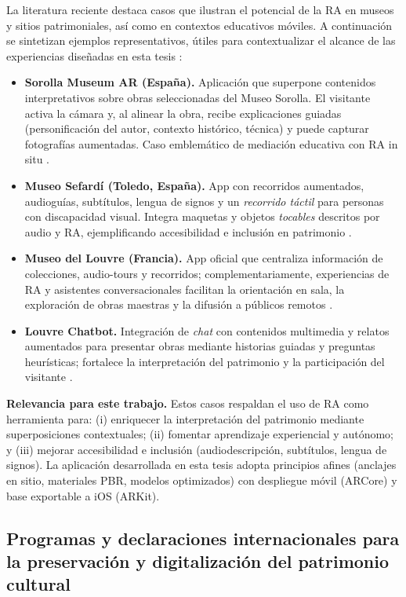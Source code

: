La literatura reciente destaca casos que ilustran el potencial de la RA en museos y sitios patrimoniales, así como en contextos educativos móviles. A continuación se sintetizan ejemplos representativos, útiles para contextualizar el alcance de las experiencias diseñadas en esta tesis \cite{HernandezLopez2021}:

\begin{itemize}
  \item \textbf{Sorolla Museum AR (España).} Aplicación que superpone contenidos interpretativos sobre obras seleccionadas del Museo Sorolla. El visitante activa la cámara y, al alinear la obra, recibe explicaciones guiadas (personificación del autor, contexto histórico, técnica) y puede capturar fotografías aumentadas. Caso emblemático de mediación educativa con RA in situ \cite{HernandezLopez2021}.
  \item \textbf{Museo Sefardí (Toledo, España).} App con recorridos aumentados, audioguías, subtítulos, lengua de signos y un \emph{recorrido táctil} para personas con discapacidad visual. Integra maquetas y objetos \emph{tocables} descritos por audio y RA, ejemplificando accesibilidad e inclusión en patrimonio \cite{HernandezLopez2021}.
  \item \textbf{Museo del Louvre (Francia).} App oficial que centraliza información de colecciones, audio-tours y recorridos; complementariamente, experiencias de RA y asistentes conversacionales facilitan la orientación en sala, la exploración de obras maestras y la difusión a públicos remotos \cite{HernandezLopez2021}.
  \item \textbf{Louvre Chatbot.} Integración de \emph{chat} con contenidos multimedia y relatos aumentados para presentar obras mediante historias guiadas y preguntas heurísticas; fortalece la interpretación del patrimonio y la participación del visitante \cite{HernandezLopez2021}.
\end{itemize}

\textbf{Relevancia para este trabajo.} Estos casos respaldan el uso de RA como herramienta para: (i) enriquecer la interpretación del patrimonio mediante superposiciones contextuales; (ii) fomentar aprendizaje experiencial y autónomo; y (iii) mejorar accesibilidad e inclusión (audiodescripción, subtítulos, lengua de signos). La aplicación desarrollada en esta tesis adopta principios afines (anclajes en sitio, materiales \gls{PBR}, modelos optimizados) con despliegue móvil (ARCore) y base exportable a iOS (ARKit).

\subsection*{Programas y declaraciones internacionales para la preservación y digitalización del patrimonio cultural}

